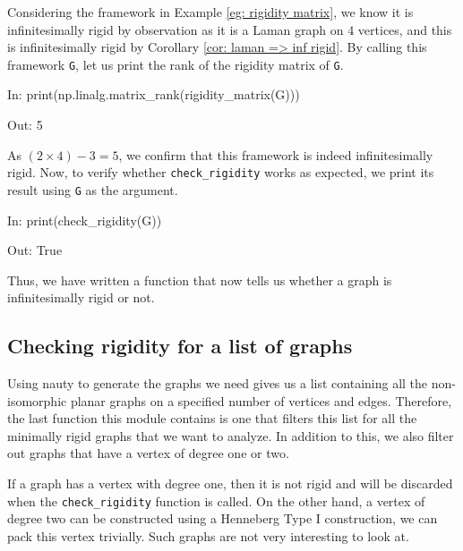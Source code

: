 \begin{flushleft}
Considering the framework in Example \ref{eg: rigidity matrix}, we know it is infinitesimally rigid by observation as it is a Laman graph on 4 vertices, and this is infinitesimally rigid by Corollary \ref{cor: laman => inf rigid}. By calling this framework \texttt{G}, let us print the rank of the rigidity matrix of \texttt{G}.
\end{flushleft}

\begin{code}
In: print(np.linalg.matrix_rank(rigidity_matrix(G)))

Out: 5
\end{code}

\begin{flushleft}
As $(2 \times 4) - 3 = 5$, we confirm that this framework is indeed infinitesimally rigid. Now, to verify whether \texttt{check\_rigidity} works as expected, we print its result using \texttt{G} as the argument. 
\end{flushleft}

\begin{code}
In: print(check_rigidity(G))

Out: True
\end{code}

\begin{flushleft}
Thus, we have written a function that now tells us whether a graph is infinitesimally rigid or not.
\end{flushleft}

\subsection{Checking rigidity for a list of graphs}

\begin{flushleft}
Using nauty to generate the graphs we need gives us a list containing all the non-isomorphic planar graphs on a specified number of vertices and edges. Therefore, the last function this module contains is one that filters this list for all the minimally rigid graphs that we want to analyze. In addition to this, we also filter out graphs that have a vertex of degree one or two. 
\end{flushleft}

\begin{flushleft}
If a graph has a vertex with degree one, then it is not rigid and will be discarded when the \texttt{check\_rigidity} function is called. On the other hand, a vertex of degree two can be constructed using a Henneberg Type I construction, we can pack this vertex trivially. Such graphs are not very interesting to look at.
\end{flushleft}

